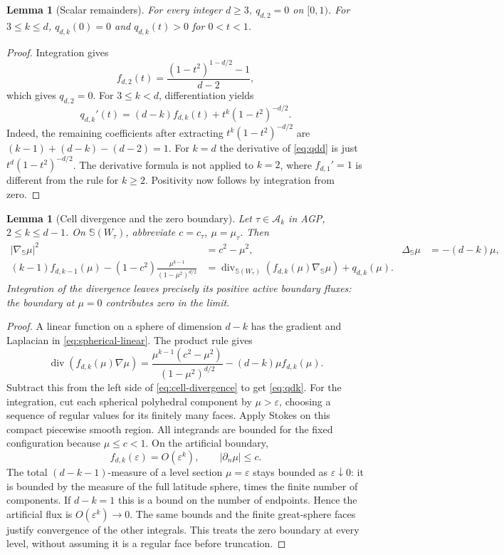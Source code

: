 \documentclass[10pt,reqno]{amsart}
\newtheorem{lemma}[theorem]{Lemma}
\theoremstyle{definition}
\theoremstyle{remark}
\newcommand{\Sphere}{\mathbb S}
\begin{document}
\begin{lemma}[Scalar remainders]\label{lem:q-positive}
For every integer $d\ge3$, $q_{d,2}=0$ on $[0,1)$. For $3\le k\le d$, $q_{d,k}(0)=0$ and $q_{d,k}(t)>0$ for $0<t<1$.
\end{lemma}
\begin{proof}
Integration gives
\begin{equation}\label{eq:fd2}
f_{d,2}(t)=\frac{(1-t^2)^{1-d/2}-1}{d-2},
\end{equation}
which gives $q_{d,2}=0$. For $3\le k<d$, differentiation yields
\begin{equation}\label{eq:q-derivative}
q_{d,k}'(t)=(d-k)f_{d,k}(t)+t^k(1-t^2)^{-d/2}.
\end{equation}
Indeed, the remaining coefficients after extracting $t^k(1-t^2)^{-d/2}$ are
$(k-1)+(d-k)-(d-2)=1$. For $k=d$ the derivative of \eqref{eq:qdd} is just $t^d(1-t^2)^{-d/2}$. The derivative formula is not applied to $k=2$, where $f_{d,1}'=1$ is different from the rule for $k\ge2$. Positivity now follows by integration from zero.
\end{proof}

\begin{lemma}[Cell divergence and the zero boundary]\label{lem:cell-divergence}
Let $\tau\in\mathcal A_k$ in AGP, $2\le k\le d-1$. On $\Sphere(W_\tau)$, abbreviate $c=c_\tau$, $\mu=\mu_\tau$. Then
\begin{align}
|\nabla_{\Sphere}\mu|^2&=c^2-\mu^2,&
\Delta_{\Sphere}\mu&=-(d-k)\mu,\label{eq:spherical-linear}\\
(k-1)f_{d,k-1}(\mu)-(1-c^2)\frac{\mu^{k-1}}{(1-\mu^2)^{d/2}}
&=\operatorname{div}_{\Sphere(W_\tau)}(f_{d,k}(\mu)\nabla_{\Sphere}\mu)+q_{d,k}(\mu).
\label{eq:cell-divergence}
\end{align}
Integration of the divergence leaves precisely its positive active boundary fluxes: the boundary at $\mu=0$ contributes zero in the limit.
\end{lemma}
\begin{proof}
A linear function on a sphere of dimension $d-k$ has the gradient and Laplacian in \eqref{eq:spherical-linear}. The product rule gives
\[
\operatorname{div}(f_{d,k}(\mu)\nabla\mu)
=\frac{\mu^{k-1}(c^2-\mu^2)}{(1-\mu^2)^{d/2}}-(d-k)\mu f_{d,k}(\mu).
\]
Subtract this from the left side of \eqref{eq:cell-divergence} to get \eqref{eq:qdk}.
For the integration, cut each spherical polyhedral component by $\mu>\varepsilon$, choosing a sequence of regular values for its finitely many faces. Apply Stokes on this compact piecewise smooth region. All integrands are bounded for the fixed configuration because $\mu\le c<1$. On the artificial boundary,
\[
f_{d,k}(\varepsilon)=O(\varepsilon^k),\qquad
|\partial_n\mu|\le c.
\]
The total $(d-k-1)$-measure of a level section $\mu=\varepsilon$ stays bounded as $\varepsilon\downarrow0$: it is bounded by the measure of the full latitude sphere, times the finite number of components. If $d-k=1$ this is a bound on the number of endpoints. Hence the artificial flux is $O(\varepsilon^k)\to0$. The same bounds and the finite great-sphere faces justify convergence of the other integrals. This treats the zero boundary at every level, without assuming it is a regular face before truncation.
\end{proof}
\end{document}
